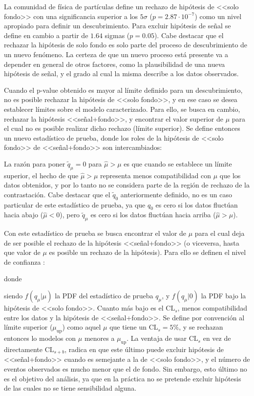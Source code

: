La comunidad de física de partículas define un rechazo de hipótesis de <<solo fondo>> con una significancia superior a los $5\sigma$ ($p=2.87 \cdot 10^{-7}$) como un nivel apropiado para definir un descubrimiento. Para excluir hipótesis de señal se define en cambio a partir de $1.64$ sigmas ($p=0.05$). Cabe destacar que el rechazar la hipótesis de solo fondo es solo parte del proceso de descubrimiento de un nuevo fenómeno. La certeza de que un nuevo proceso está presente va a depender en general de otros factores, como la plausibilidad de una nueva hipótesis de señal, y el grado al cual la misma describe a los datos observados.


Cuando el p-value obtenido es mayor al límite definido para un descubrimiento, no es posible rechazar la hipótesis de <<solo fondo>>, y en ese caso se desea establecer límites sobre el modelo caracterizado. Para ello, se busca en cambio, rechazar la hipótesis <<señal+fondo>>, y encontrar el valor superior de $\mu$ para el cual no es posible realizar dicho rechazo (límite superior). Se define entonces un nuevo estadístico de prueba, donde los roles de la hipótesis de <<solo fondo>> de <<señal+fondo>> son intercambiados:



La razón para poner $\tilde{q}_{\mu} = 0$ para $\hat{\mu}>\mu$ es que cuando se establece un límite superior, el hecho de que $\hat{\mu}>\mu$ representa menos compatibilidad con $\mu$ que los datos obtenidos, y por lo tanto no se considera parte de la región de rechazo de la contrastación. Cabe destacar que el $\tilde{q}_0$ anteriormente definido, no es un caso particular de este estadístico de prueba, ya que $q_0$ es cero si los datos fluctúan hacia abajo ($\hat{\mu}<0$), pero $\tilde{q}_{\mu}$ es cero si los datos fluctúan hacia arriba ($\hat{\mu}>\mu$).

Con este estadístico de prueba se busca encontrar el valor de $\mu$ para el cual deja de ser posible el rechazo de la hipótesis <<señal+fondo>> (o viceversa, hasta que valor de $\mu$ es posible un rechazo de la hipótesis). Para ello se definen el nivel de confianza \cite{Read:2002hq}:


 
donde


siendo $f(q_\mu|\mu)$ la PDF del estadístico de prueba $q_\mu$, y $f(q_\mu|0)$ la PDF bajo la hipótesis de <<solo fondo>>. Cuanto más bajo es el $\text{CL}_{s}$, menos compatibilidad entre los datos y la hipótesis de <<señal+fondo>>. Se define por convención al límite superior ($\mu_{\text{up}}$) como aquel $\mu$ que tiene un $\text{CL}_{s}=5\%$, y se rechazan entonces lo modelos con $\mu$ menores a $\mu_{\text{up}}$. La ventaja de usar $\text{CL}_{s}$ en vez de directamente $\text{CL}_{s+b}$, radica en que este último puede excluir hipótesis de <<señal+fondo>> cuando es semejante a la de <<solo fondo>>, y el número de eventos observados es mucho menor que el de fondo. Sin embargo, esto último no es el objetivo del análisis, ya que en la práctica no se pretende excluir hipótesis de las cuales no se tiene sensibilidad alguna. 






